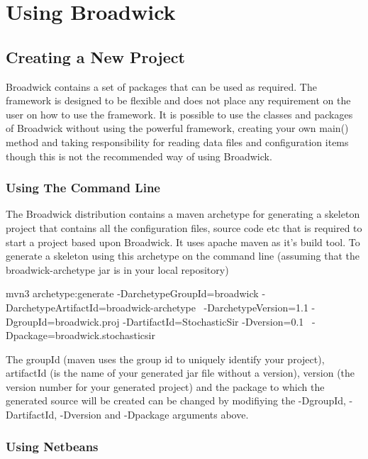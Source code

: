\chapter{Using Broadwick}

\section{Creating a New Project}

Broadwick contains a set of packages that can be used as required. The framework is designed to be flexible and does not place any requirement on the user on how to use the framework. It is possible to use the classes and packages of Broadwick without using the powerful framework, creating your own main() method and taking responsibility for reading data files and configuration items though this is not the recommended way of using Broadwick.

\subsection{Using The Command Line}

The Broadwick distribution contains a maven archetype for generating a skeleton project that contains all the configuration files, source code etc that is required to start a project based upon Broadwick. It uses apache maven as it’s build tool. To generate a skeleton using this archetype on the command line (assuming that the broadwick-archetype jar is in your local repository) 

\begin{sourcecode}
mvn3 archetype:generate -DarchetypeGroupId=broadwick -DarchetypeArtifactId=broadwick-archetype \
-DarchetypeVersion=1.1 -DgroupId=broadwick.proj -DartifactId=StochasticSir -Dversion=0.1 \
-Dpackage=broadwick.stochasticsir
\end{sourcecode}

The groupId (maven uses the group id to uniquely identify your project), artifactId (is the name of your generated jar file without a version), version (the version number for your generated project) and the package to which the generated source will be created can be changed by modifiying the  -DgroupId, -DartifactId, -Dversion and -Dpackage arguments above.

\subsection{Using Netbeans}\index{Using Netbeans}

